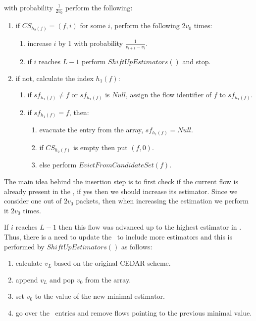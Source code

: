 with probability $\frac{1}{2v_0}$ perform the following:
    \begin{enumerate}
        \item\label{step:1} if $CS_{h_2(f)} = (f,i)$ for some $i$, perform the following $2v_0$ times:
        \begin{enumerate}
            \item\label{step:1:a} increase $i$ by 1 with probability $\frac{1}{v_{i+1}-v_i}$.
            \item\label{step:1:b} if $i$ reaches $L-1$ perform $ShiftUpEstimators()$ and stop.
        \end{enumerate}
        \item\label{step:2} if not, calculate the index $h_1(f)$:
        \begin{enumerate}
            \item\label{step:2:a} if $sf_{h_1(f)}\neq f$ or $sf_{h_1(f)}$ is $Null$, assign the flow identifier of $f$ to $sf_{h_1(f)}$.
            \item\label{step:2:b} if $sf_{h_1(f)}=f$, then:
            \begin{enumerate}
                \item\label{step:2:b:i} evacuate the entry from the array, $sf_{h_1(f)} = Null$.
                \item\label{step:2:b:ii} if $CS_{h_2(f)}$ is empty then put $(f,0)$.
                \item\label{step:2:b:iii} else perform $EvictFromCandidateSet(f)$.
            \end{enumerate}
        \end{enumerate}
    \end{enumerate}
    
The main idea behind the insertion step is to first check if the current flow is already present in the \cs, if yes then we should increase its estimator. Since we consider one out of $2v_0$ packets, then when increasing the estimation we perform it $2v_0$ times.

If $i$ reaches $L-1$ then this flow was advanced up to the highest estimator in \sea. Thus, there is a need to update the \sea\ to include more estimators and this is performed by $ShiftUpEstimators()$ as follows:
\begin{enumerate}
    \item calculate $v_L$ based on the original CEDAR scheme.
    \item append $v_L$ and pop $v_0$ from the array.
    \item set $v_0$ to the value of the new minimal estimator.
    \item\label{step:4} go over the \cs\ entries and remove flows pointing to the previous minimal value.
\end{enumerate}

